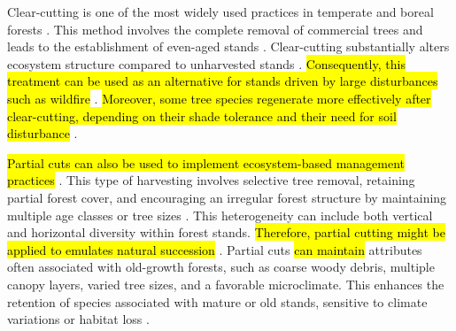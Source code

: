 Clear-cutting is one of the most widely used practices in temperate and boreal forests \citep{Fedrowitz2014Canretention,Chaudhary2016Impactforest}. 
This method involves the complete removal of commercial trees and leads to the establishment of even-aged stands \citep{Brashears2004AssessmentCanopy,Martin2020Forestmanagement}. 
Clear-cutting substantially alters ecosystem structure compared to unharvested stands \citep{Hanski2000Extinctiondebt}. 
\hl{Consequently, this treatment can be used as an alternative for stands driven by large disturbances such as wildfire} \citep{Bergeron1999Forestmanagementa}. 
\hl{Moreover, some tree species regenerate more effectively after clear-cutting, depending on their shade tolerance and their need for soil disturbance} \citep{Bergeron1999Forestmanagementa}. 

\hl{Partial cuts can also be used to implement ecosystem-based management practices} \citep{Bergeron1999Forestmanagementa,Raymond2009irregularshelterwood}. 
This type of harvesting involves selective tree removal, retaining partial forest cover, and encouraging an irregular forest structure by maintaining multiple age classes or tree sizes \citep{Raymond2009irregularshelterwood}. 
This heterogeneity can include both vertical and horizontal diversity within forest stands. 
\hl{Therefore, partial cutting might be applied to emulates natural succession} \citep{Bergeron1999Forestmanagementa}.
Partial cuts \hl{can maintain} attributes often associated with old-growth forests, such as coarse woody debris, multiple canopy layers, varied tree sizes, and a favorable microclimate. 
This enhances the retention of species associated with mature or old stands, sensitive to climate variations or habitat loss \citep{Hansen1991Conservingbiodiversity,Ameray2021Forestcarbon}. 

